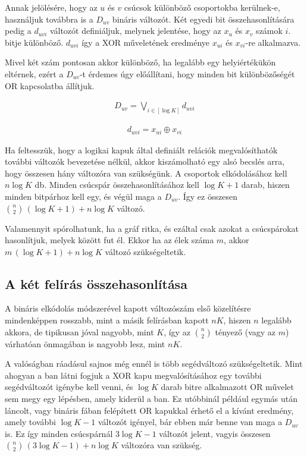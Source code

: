 Annak jelölésére, hogy az $u$ és $v$ csúcsok különböző csoportokba kerülnek-e, használjuk továbbra is a $D_{uv}$ bináris változót. Két egyedi bit összehasonlítására pedig a $d_{uvi}$ változót definiáljuk, melynek jelentése, hogy az $x_u$ és $x_v$ számok $i.$ bitje különböző. $d_{uvi}$ így a XOR műveletének eredménye $x_{ui}$ és  $x_{vi}$-re alkalmazva.

Mivel két szám pontosan akkor különböző, ha legalább egy helyiértékükön eltérnek, ezért a $D_{uv}$-t érdemes úgy előállítani, hogy minden bit különbözőségét OR kapcsolatba állítjuk.

\begin{align}
	D_{uv} = \bigvee_{i \in [ \log K ] }{d_{uvi}}
\end{align}

\begin{align}
	d_{uvi} = x_{ui} \oplus x_{vi}
\end{align}

Ha feltesszük, hogy a logikai kapuk által definiált relációk megvalósíthatók további változók bevezetése nélkül, akkor kiszámolható egy alsó becslés arra, hogy összesen hány változóra van szükségünk. A csoportok elkódolásához kell $n \log K$ db. Minden csúcspár összehasonlításához kell $\log K + 1$ darab, hiszen minden bitpárhoz kell egy, és végül maga a $D_{uv}$. Így ez összesen $\binom{n}{2} \, ( \log K + 1 ) + n\log K$ változó.

Valamennyit spórolhatunk, ha a gráf ritka, és ezáltal csak azokat a csúcspárokat hasonlítjuk, melyek között fut él. Ekkor ha az élek száma $m$, akkor $m \, ( \log K + 1 ) + n\log K$ változó szükségeltetik.

\subsection{A két felírás összehasonlítása}\label{sec:theoryonehotVSbinary}

A bináris elkódolás módszerével kapott változószám első közelítésre mindenképpen rosszabb, mint a másik felírásban kapott $nK$, hiszen $n$ legalább akkora, de tipikusan jóval nagyobb, mint $K$, így az $\binom{n}{2}$ tényező (vagy az $m$) várhatóan önmagában is nagyobb lesz, mint $nK$.

A valóságban ráadásul sajnos még ennél is több segédváltozó szükségeltetik. Mint ahogyan a ban látni fogjuk a XOR kapu megvalósításához egy további segédváltozót igénybe kell venni, és $\log K$ darab bitre alkalmazott OR művelet sem megy egy lépésben, amely kiderül a ban. Ez utóbbinál például egymás után láncolt, vagy bináris fában felépített OR kapukkal érhető el a kívánt eredmény, amely további $\log K -1$ változót igényel, bár ebben már benne van maga a $D_{uv}$ is. Ez így minden csúcspárnál $3\log K - 1$ változót jelent, vagyis összesen $\binom{n}{2} \, (3\log K -  1 ) + n \log K$ változóra van szükség.
 
